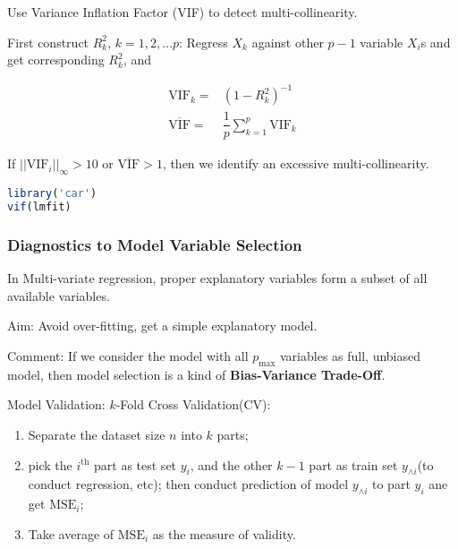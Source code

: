     Use Variance Inflation Factor (VIF) to detect multi-collinearity.

    First construct $ R^2_k $, $ k=1,2,\ldots p $: Regress $ X_k $ against other $ p-1 $ variable $ X_i $s and get corresponding $ R^2_k $, and 

    \begin{align}
        \mathrm{VIF}_k=&(1-R^2_k)^{-1}\\
        \overline{\mathrm{VIF}} =&\dfrac{1}{p}\sum_{k=1}^p\mathrm{VIF}_k 
    \end{align}

    
    If $ ||\mathrm{VIF}_i||_{\infty}>10 $ or $ \overline{\mathrm{VIF}}> 1 $, then we identify an excessive multi-collinearity.

\begin{rcode}
\begin{lstlisting}[language=R]
library('car')
vif(lmfit)
\end{lstlisting}
\end{rcode}
    


    
\subsubsection{Diagnostics to Model Variable Selection}

        In Multi-variate regression, proper explanatory variables form a subset of all available variables.

        Aim: Avoid over-fitting, get a simple explanatory model.

        Comment: If we consider the model with all $ p_\mathrm{max} $ variables as full, unbiased model, then model selection is a kind of \textbf{Bias-Variance Trade-Off}. 

\begin{point}
    Model Validation: $ k $-Fold Cross Validation(CV): 
    \begin{enumerate}[topsep=2pt,itemsep=2pt]
        \item Separate the dataset size $ n $ into $ k $ parts;
        \item pick the $ i^\mathrm{th} $ part as test set $ y_i $, and the other $ k-1 $ part as train set $ y_{\wedge i} $(to conduct regression, etc); then conduct prediction of model $ y_{\wedge i} $ to part $ y_i $ ane get $ \mathrm{MSE}_i $;
        \item Take average of $ \mathrm{MSE}_i $ as the measure of validity.
    \end{enumerate}
\end{point}




